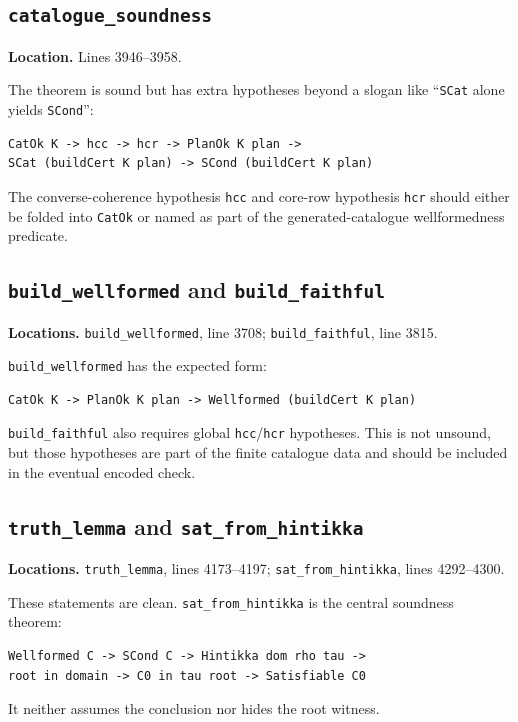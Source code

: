 \documentclass[11pt]{article}
\begin{document}
\subsection{\texttt{catalogue\_soundness}}

\textbf{Location.} Lines 3946--3958.

The theorem is sound but has extra hypotheses beyond a slogan like
``\texttt{SCat} alone yields \texttt{SCond}'':
\begin{lstlisting}
CatOk K -> hcc -> hcr -> PlanOk K plan ->
SCat (buildCert K plan) -> SCond (buildCert K plan)
\end{lstlisting}
The converse-coherence hypothesis \texttt{hcc} and core-row hypothesis
\texttt{hcr} should either be folded into \texttt{CatOk} or named as part of
the generated-catalogue wellformedness predicate.

\subsection{\texttt{build\_wellformed} and \texttt{build\_faithful}}

\textbf{Locations.} \texttt{build\_wellformed}, line 3708; \texttt{build\_faithful}, line 3815.

\texttt{build\_wellformed} has the expected form:
\begin{lstlisting}
CatOk K -> PlanOk K plan -> Wellformed (buildCert K plan)
\end{lstlisting}
\texttt{build\_faithful} also requires global \texttt{hcc}/\texttt{hcr}
hypotheses.  This is not unsound, but those hypotheses are part of the finite
catalogue data and should be included in the eventual encoded check.

\subsection{\texttt{truth\_lemma} and \texttt{sat\_from\_hintikka}}

\textbf{Locations.} \texttt{truth\_lemma}, lines 4173--4197;
\texttt{sat\_from\_hintikka}, lines 4292--4300.

These statements are clean.  \texttt{sat\_from\_hintikka} is the central
soundness theorem:
\begin{lstlisting}
Wellformed C -> SCond C -> Hintikka dom rho tau ->
root in domain -> C0 in tau root -> Satisfiable C0
\end{lstlisting}
It neither assumes the conclusion nor hides the root witness.
\end{document}
